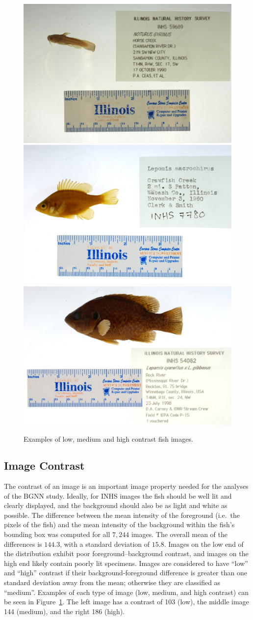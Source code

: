 \documentclass[conference]{IEEEtran}
\begin{document}
\begin{figure}[t]
  \centering
  \includegraphics[width=0.31\linewidth]{images/dark}
  \includegraphics[width=0.31\linewidth]{images/normal}
  \includegraphics[width=0.31\linewidth]{images/bright}
  \caption{Examples of low, medium and high contrast fish images.}
  \label{fig:contrast}
\end{figure}

\subsection{Image Contrast}
The contrast of an image is an important image property needed
for the analyses of the BGNN study. Ideally, for INHS images the fish should be well lit and clearly displayed, and the background should also be as light and white as possible.
The difference between
the mean intensity of the foreground (i.e.\ the pixels of the fish) and the mean intensity of the background within the fish's bounding box
was computed for all \(7,244\) images.
The overall mean of the differences is \(144.3\), with a standard deviation of \(15.8\). Images on the low end of the distribution exhibit poor foreground--background contrast, and images on the high end likely contain poorly lit specimens.
Images are considered to have ``low'' and
``high'' contrast if their background-foreground difference is greater than
one standard deviation away from the mean; otherwise they are classified as
``medium''.
Examples of each type of image (low, medium, and high contrast) can be seen in Figure~\ref{fig:contrast}.
The left image has a contrast of 103 (low), the middle image 144
(medium), and the right 186 (high).
\end{document}
